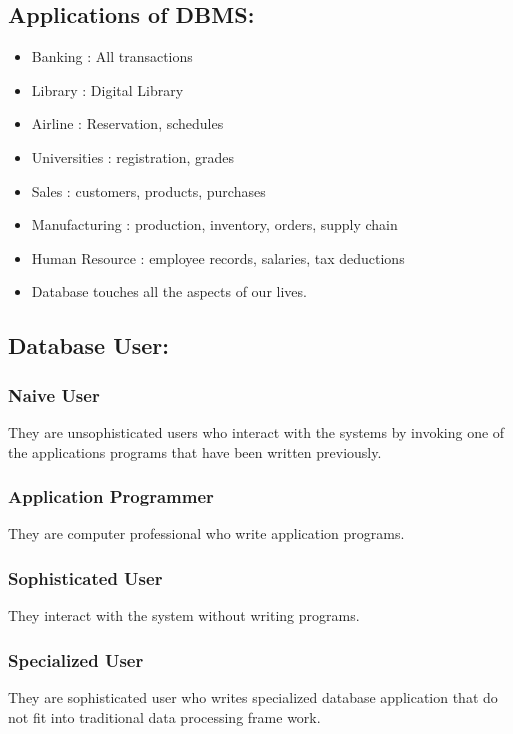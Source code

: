 \documentclass[11pt]{article}
\begin{document}
\subsection{Applications of DBMS:}
\label{sec:orgdf88a11}
\begin{itemize}
\item Banking : All transactions
\item Library : Digital Library
\item Airline : Reservation, schedules
\item Universities : registration, grades
\item Sales : customers, products, purchases
\item Manufacturing : production, inventory, orders, supply chain
\item Human Resource : employee records, salaries, tax deductions
\item Database touches all the aspects of our lives.
\end{itemize}
\subsection{Database User:}
\label{sec:org0b041ba}
\subsubsection{Naive User}
\label{sec:orgedfee58}
They are unsophisticated users who interact with the systems by invoking one of the applications programs that have been written previously.
\subsubsection{Application Programmer}
\label{sec:orgb84fdea}
They are computer professional who write application programs.
\subsubsection{Sophisticated User}
\label{sec:org9e137ee}
They interact with the system without writing programs.
\subsubsection{Specialized User}
\label{sec:orgfbc1eca}
They are sophisticated user who writes specialized database application that do not fit into traditional data processing frame work.
\end{document}
